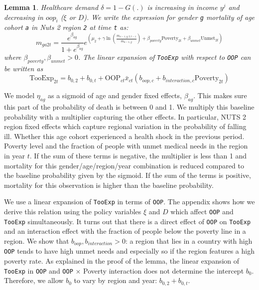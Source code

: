 \documentclass[a4paper,12pt]{article}
\newtheorem{lemma}{Lemma}
\begin{document}
\begin{lemma}
Healthcare demand \(\delta = 1-G(.)\) is increasing in income \(y^j\) and decreasing in \(oop_i\) (\(\xi\) or \(D\)). We write the expression for gender \texttt{g} mortality of age cohort \texttt{a} in Nuts 2 region \texttt{2} at time \texttt{t} as:
$$
m_{ga2t} = \frac{e^{\beta_{ag}}}{1+e^{\beta_{ag}}} e^{\left( \mu_2 + \gamma \ln \left(\frac{m_{a-1,g,2,t-1}}{\bar{m}_{a-1,g}}\right)+ \beta_{poverty}\text{Poverty}_{2t} + \beta_{unmet}\text{Unmet}_{2t}\right)}
$$
where \(\beta_{poverty}, \beta_{unmet} > 0\). The linear expansion of \texttt{TooExp} with respect to \texttt{OOP} can be written as
$$
\text{TooExp}_{2t} = b_{0,2} + b_{0,t} + \text{OOP}_{ct} \bar{x}_{ct} \left(  b_{oop,c} + b_{interaction,c} \text{Poverty}_{2t} \right)
$$
\label{prop:1}
\end{lemma}

We model \({\eta}_{ag}\) as a sigmoid of age and gender fixed effects, \(\beta_{ag}\). This makes sure this part of the probability of death is between 0 and 1. We multiply this baseline probability with a multiplier capturing the other effects. In particular, NUTS 2 region fixed effects which capture regional variation in the probability of falling ill. Whether this age cohort experienced a health shock in the previous period. Poverty level and the fraction of people with unmet medical needs in the region in year \(t\). If the sum of these terms is negative, the multiplier is less than 1 and mortality for this gender/age/region/year combination is reduced compared to the baseline probability given by the sigmoid. If the sum of the terms is positive, mortality for this observation is higher than the baseline probability.

We use a linear expansion of \texttt{TooExp} in terms of \texttt{OOP}. The appendix shows how we derive this relation using the policy variables \(\xi\) and \(D\) which affect \texttt{OOP} and \texttt{TooExp} simultaneously. It turns out that there is a direct effect of \texttt{OOP} on \texttt{TooExp} and an interaction effect with the fraction of people below the poverty line in a region. We show that \(b_{oop},b_{interaction} > 0\): a region that lies in a country with high \texttt{OOP} tends to have high unmet needs and especially so if the region features a high poverty rate. As explained in the proof of the lemma, the linear expansion of \texttt{TooExp} in \texttt{OOP} and \texttt{OOP} \(\times\) Poverty interaction does not determine the intercept \(b_{0}\). Therefore, we allow \(b_0\) to vary by region and year: \(b_{0,2} + b_{0,t}\). 
\end{document}
